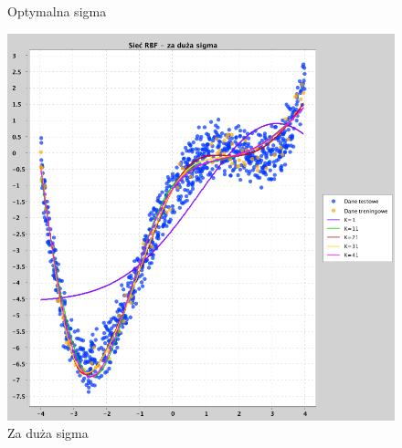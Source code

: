 \documentclass[a4paper, portrait,11pt]{article}
\begin{document}
\begin{figure}[!htb]
\begin{minipage}{0.33\textwidth}
    \caption{\label{fig:1optimalderivative}Optymalna sigma}
  \end{minipage}
  \begin{minipage}{0.33\textwidth}
    \centering
    \includegraphics[width=1\linewidth]{../data/approximation3/1/derivatives/big.png}
    \caption{\label{fig:1bigderivative}Za duża sigma}
  \end{minipage}\hfill
\end{figure}
\end{document}
